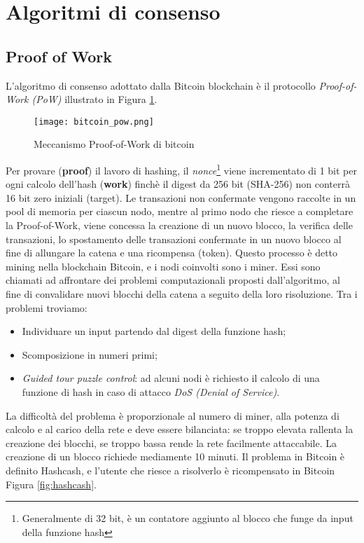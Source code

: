 \section{Algoritmi di consenso}
\subsection{Proof of Work}
L'algoritmo di consenso adottato dalla Bitcoin blockchain è il protocollo \textit{Proof-of-Work (PoW)} illustrato in Figura \ref{fig:bitcoin_pow}.

\begin{figure}[htbp]
  \centering
  \texttt{[image: bitcoin\_pow.png]}
  \caption{Meccanismo Proof-of-Work di bitcoin}
  \label{fig:bitcoin_pow}
\end{figure}

Per provare (\textbf{proof}) il lavoro di hashing, il \textit{nonce}\footnote{Generalmente di 32 bit, è un contatore aggiunto al blocco che funge da input della funzione hash} viene incrementato di 1 bit per ogni calcolo dell'hash (\textbf{work}) finchè il digest da 256 bit (SHA-256) non conterrà 16 bit zero iniziali (target).
Le transazioni non confermate vengono raccolte in un pool di memoria per ciascun nodo, mentre al primo nodo che riesce a completare la Proof-of-Work, viene concessa la creazione di un nuovo blocco, la verifica delle transazioni, lo spostamento delle transazioni confermate in un nuovo blocco al fine di allungare la catena e una ricompensa (token). Questo processo è detto mining nella blockchain Bitcoin, e i nodi coinvolti sono i miner. Essi sono chiamati ad affrontare dei problemi computazionali proposti dall'algoritmo, al fine di convalidare nuovi blocchi della catena a seguito della loro risoluzione. Tra i problemi troviamo:

\begin{itemize}
  \item Individuare un input partendo dal digest della funzione hash;
  \item Scomposizione in numeri primi;
  \item \textit{Guided tour puzzle control}: ad alcuni nodi è richiesto il calcolo di una funzione di hash in caso di attacco \textit{DoS (Denial of Service)}.
\end{itemize}

La difficoltà del problema è proporzionale al numero di miner, alla potenza di calcolo e al carico della rete e deve essere bilanciata: se troppo elevata rallenta la creazione dei blocchi, se troppo bassa rende la rete facilmente attaccabile. La creazione di un blocco richiede mediamente 10 minuti. Il problema in Bitcoin è definito Hashcash, e l'utente che riesce a risolverlo è ricompensato in Bitcoin Figura \ref{fig:hashcash}.

